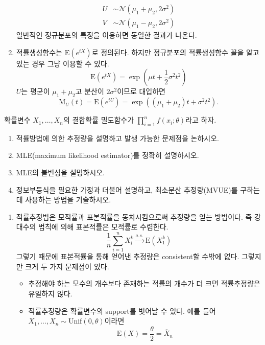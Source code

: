 \documentclass[answers]{exam}
\begin{document}
\begin{questions}
\begin{solution}
\begin{enumerate}
\begin{align}
        U &\sim \mathcal{N}\left(\mu_{1}+\mu_{2},2\sigma^{2}\right)\\
        V &\sim \mathcal{N}\left(\mu_{1}-\mu_{2}, 2\sigma^{2}\right)
      \end{align}
      일반적인 정규분포의 특징을 이용하면 동일한 결과가 나온다.
      \item 적률생성함수는 $\mathrm{E}\left(e^{tX}\right)$로 정의된다. 하지만 정규분포의 적률생성함수 꼴을 알고 있는 경우 그냥 이용할 수 있다.
      $$
        \mathrm{E}\left(e^{tX}\right) = \exp\left(\mu t+\dfrac{1}{2}\sigma^{2}t^{2}\right)
      $$
      $U$는 평균이 $\mu_{1}+\mu_{2}$고 분산이 $2\sigma^{2}$이므로 대입하면
      $$
        \mathrm{M}_{U}\left(t\right)=\mathrm{E}\left(e^{tU}\right) = \exp\left(\left(\mu_{1}+\mu_{2}\right)t+\sigma^{2}t^{2}\right).
      $$
    \end{enumerate}
   \end{solution}
   \question
   확률변수 $X_{1},\ldots , X_{n}$의 결합확률 밀도함수가 $\displaystyle \prod_{i=1}^{n}f\left(x_{i};\theta\right)$라고 하자.
   \begin{enumerate}
    \item 적률방법에 의한 추정량을 설명하고 발생 가능한 문제점을 논하시오.
    \item MLE(maximum likelihood estimator)를 정확히 설명하시오.
    \item MLE의 불변성을 설명하시오.
    \item 정보부등식을 필요한 가정과 더불어 설명하고, 최소분산 추정량(MVUE)를 구하는 데 사용하는 방법을 기술하시오.
   \end{enumerate}
   \begin{solution}
    \begin{enumerate}
      \item 적률추정법은 모적률과 표본적률을 동치시킴으로써 추정량을 얻는 방법이다. 즉 강대수의 법칙에 의해 표본적률은 모적률로 수렴한다.
      $$
        \dfrac{1}{n}\sum_{i=1}^{n}X_{i}^{k} \xrightarrow{a.s.}\mathrm{E}\left(X_{1}^{k}\right)
      $$
      그렇기 때문에 표본적률을 통해 얻어낸 추정량은 consistent할 수밖에 없다. 그렇지만 크게 두 가지 문제점이 있다.
      \begin{itemize}
      \item 추정해야 하는 모수의 개수보다 존재하는 적률의 개수가 더 크면 적률추정량은 유일하지 않다.
      \item 적률추정량은 확률변수의 support를 벗어날 수 있다. 예를 들어 $X_{1},\ldots,X_{n}\sim \mathrm{Unif}\left(0,\theta\right)$이라면 
      $$
        \mathrm{E}\left(X\right) = \dfrac{\theta}{2} = \overline{X}_{n}
$$
\end{itemize}
\end{enumerate}
\end{solution}
\end{questions}
\end{document}
